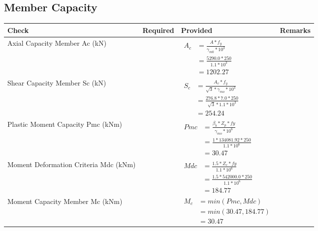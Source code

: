 \documentclass{article}%
\begin{document}
\subsection{Member Capacity}%
\label{subsec:MemberCapacity}%
\renewcommand{\arraystretch}{1.2}%
\begin{longtable}{|p{4cm}|p{5cm}|p{5.5cm}|p{1.5cm}|}%
\hline%
\rowcolor{OsdagGreen}%
Check&Required&Provided&Remarks\\%
\hline%
\endhead%
\hline%
Axial Capacity Member Ac (kN)&&$\begin{aligned} A_c &=\frac{A*f_y}{\gamma_{m0} *10^3}\\ &=\frac{5290.0*250}{1.1* 10^3}\\ &=1202.27\end{aligned}$&\\%
\hline%
Shear Capacity Member Sc (kN)&&$\begin{aligned} S_c &= \frac{A_v*f_y}{\sqrt{3}*\gamma_{mo} *10^3}\\ &=\frac{276.8*7.0*250}{\sqrt{3}*1.1 *10^3}\\ &=254.24\end{aligned}$&\\%
\hline%
Plastic Moment Capacity Pmc (kNm)&&$\begin{aligned} Pmc &= \frac{\beta_b * Z_p *fy}{\gamma_{mo} * 10^6}\\ &=\frac{1*134081.92*250}{1.1 * 10^6}\\ &=30.47\end{aligned}$&\\%
\hline%
Moment Deformation Criteria Mdc (kNm)&&$\begin{aligned} Mdc &= \frac{1.5 *Z_e *fy}{1.1* 10^6}\\ &= \frac{1.5 *542000.0*250}{1.1* 10^6}\\ &= 184.77\end{aligned}$&\\%
\hline%
Moment Capacity Member Mc (kNm)&&$\begin{aligned} M_c &= min(Pmc,Mdc)\\ &=min(30.47,184.77)\\ &=30.47\end{aligned}$&\\%
\hline%
\end{longtable}

%
\newpage%
\end{document}
